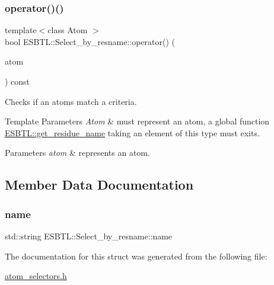 \subsubsection{\texorpdfstring{operator()()}{operator()()}}
{\footnotesize\ttfamily template$<$class Atom $>$ \\
bool E\+S\+B\+T\+L\+::\+Select\+\_\+by\+\_\+resname\+::operator() (\begin{DoxyParamCaption}\item[{const Atom \&}]{atom }\end{DoxyParamCaption}) const\hspace{0.3cm}{\ttfamily [inline]}}

Checks if an atoms match a criteria. 
\begin{DoxyTemplParams}{Template Parameters}
{\em Atom} & must represent an atom, a global function \hyperlink{namespaceESBTL_ac67e09aee9aee533dd3953a094a52516}{E\+S\+B\+T\+L\+::get\+\_\+residue\+\_\+name} taking an element of this type must exits. \\
\hline
\end{DoxyTemplParams}

\begin{DoxyParams}{Parameters}
{\em atom} & represents an atom. \\
\hline
\end{DoxyParams}


\subsection{Member Data Documentation}
\mbox{\label{structESBTL_1_1Select__by__resname_a4e5daa2b6242ddd71736a2893d08427e}} 
\subsubsection{\texorpdfstring{name}{name}}
{\footnotesize\ttfamily std\+::string E\+S\+B\+T\+L\+::\+Select\+\_\+by\+\_\+resname\+::name}



The documentation for this struct was generated from the following file\+:\begin{DoxyCompactItemize}
\item 
\hyperlink{atom__selectors_8h}{atom\+\_\+selectors.\+h}\end{DoxyCompactItemize}
